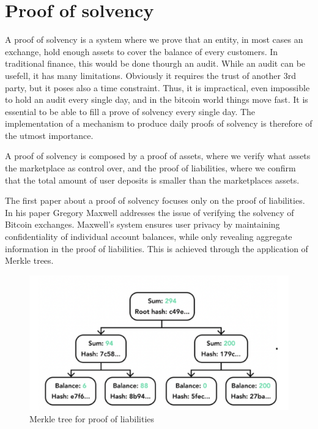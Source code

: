 


\section{Proof of solvency}

A proof of solvency is a system where we prove that an entity, in most cases an exchange, hold enough assets to cover
the balance of every customers. In traditional finance, this would be done thourgh an audit. While an audit can be usefell,
it has many limitations. Obviously it requires the trust of another 3rd party, but it poses also a time constraint. Thus, it is impractical, even impossible
to hold an audit every single day, and in the bitcoin world things move fast. It is essential to be able to fill a prove of solvency every single day.
The implementation of a mechanism to produce daily proofs of solvency is therefore of the utmost importance.

A proof of solvency is composed by a proof of assets, where we verify what assets the marketplace as control over, and the proof of liabilities,
where we confirm that the total amount of user deposits is smaller than the marketplaces assets. 


The first paper about a proof of solvency focuses only on the proof of liabilities. In his paper Gregory Maxwell addresses the issue of verifying 
the solvency of Bitcoin exchanges. \cite{chainlink_blog}
Maxwell's system ensures user privacy by maintaining confidentiality of individual account balances, while only revealing aggregate information in the proof of liabilities. 
This is achieved through the application of Merkle trees. 

\begin{figure}[H]
    \centering
    \includegraphics[width=130mm]{MerkleTreeLiabilities.png}
    \caption{Merkle tree for proof of liabilities}
    \label{overflow}
    \end{figure}

